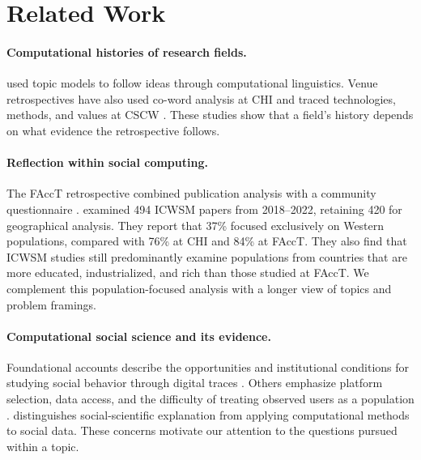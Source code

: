 \section{Related Work}
\paragraph{Computational histories of research fields.}
\citet{hall2008} used topic models to follow ideas through computational linguistics. Venue retrospectives have also used co-word analysis at CHI \citep{liu2014} and traced technologies, methods, and values at CSCW \citep{wallace2017}. These studies show that a field's history depends on what evidence the retrospective follows.

\paragraph{Reflection within social computing.}
The FAccT retrospective combined publication analysis with a community questionnaire \citep{facct2022}. \citet{weird2024} examined 494 ICWSM papers from 2018--2022, retaining 420 for geographical analysis. They report that 37\% focused exclusively on Western populations, compared with 76\% at CHI and 84\% at FAccT. They also find that ICWSM studies still predominantly examine populations from countries that are more educated, industrialized, and rich than those studied at FAccT. We complement this population-focused analysis with a longer view of topics and problem framings.

\paragraph{Computational social science and its evidence.}
Foundational accounts describe the opportunities and institutional conditions for studying social behavior through digital traces \citep{lazer2009,lazer2020}. Others emphasize platform selection, data access, and the difficulty of treating observed users as a population \citep{ruths2014,p14517}. \citet{wallach2018} distinguishes social-scientific explanation from applying computational methods to social data. These concerns motivate our attention to the questions pursued within a topic.

